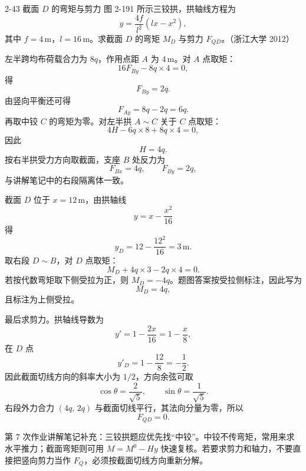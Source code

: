 \begin{problemcard}{2-43 截面 \(D\) 的弯矩与剪力}
图 2-191 所示三铰拱，拱轴线方程为
\[
  y=\frac{4f}{l^2}(lx-x^2),
\]
其中 \(f=4\,\mathrm{m}\)，\(l=16\,\mathrm{m}\)。求截面 \(D\) 的弯矩 \(M_D\) 与剪力 \(F_{QD}\)。（浙江大学 2012）
\begin{figure}[H]
\centering
{}
\end{figure}
\end{problemcard}

\begin{solutioncard}

左半跨均布荷载合力为 \(8q\)，作用点距 \(A\) 为 \(4\,\mathrm{m}\)。对 \(A\) 点取矩：
\[
  16F_{By}-8q\times4=0,
\]
得
\[
  F_{By}=2q.
\]
由竖向平衡还可得
\[
  F_{Ay}=8q-2q=6q.
\]
再取中铰 \(C\) 的弯矩为零。对左半拱 \(A\sim C\) 关于 \(C\) 点取矩：
\[
  4H-6q\times8+8q\times4=0,
\]
因此
\[
  H=4q.
\]
按右半拱受力方向取截面，支座 \(B\) 处反力为
\[
  F_{Bx}=4q,\qquad F_{By}=2q,
\]
与讲解笔记中的右段隔离体一致。

截面 \(D\) 位于 \(x=12\,\mathrm{m}\)，由拱轴线
\[
  y=x-\frac{x^2}{16}
\]
得
\[
  y_D=12-\frac{12^2}{16}=3\,\mathrm{m}.
\]
取右段 \(D\sim B\)，对 \(D\) 点取矩：
\[
  M_D+4q\times3-2q\times4=0.
\]
若按代数弯矩取下侧受拉为正，则 \(M_D=-4q\)。题图答案按受拉侧标注，因此写为
\[
  M_D=4q,
\]
且标注为上侧受拉。

最后求剪力。拱轴线导数为
\[
  y'=1-\frac{2x}{16}=1-\frac{x}{8},
\]
在 \(D\) 点
\[
  y'_D=1-\frac{12}{8}=-\frac12.
\]
因此截面切线方向的斜率大小为 \(1/2\)，方向余弦可取
\[
  \cos\theta=\frac{2}{\sqrt5},\qquad \sin\theta=\frac{1}{\sqrt5}.
\]
右段外力合力 \((4q,\,2q)\) 与截面切线平行，其法向分量为零，所以
\[
  F_{QD}=0.
\]
\end{solutioncard}

\begin{notecard}
第 7 次作业讲解笔记补充：三铰拱题应优先找“中铰”。中铰不传弯矩，常用来求水平推力；截面弯矩则可用 \(M=M^0-Hy\) 快速复核。若要求剪力和轴力，不要直接把竖向剪力当作 \(F_Q\)，必须按截面切线方向重新分解。
\end{notecard}
